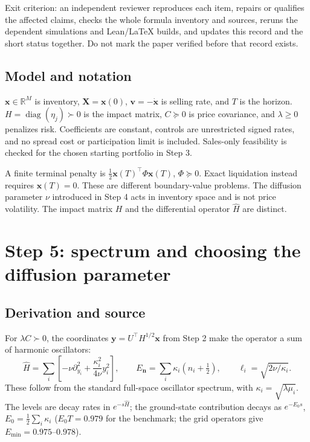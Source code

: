 \documentclass[11pt,a4paper]{article}
\begin{document}
Exit criterion: an independent reviewer reproduces each item, repairs or
qualifies the affected claims, checks the whole formula inventory and sources,
reruns the dependent simulations and Lean/LaTeX builds, and updates this
record and the short status together. Do not mark the paper verified before
that record exists.

\subsection*{Model and notation}

$\mathbf x\in\mathbb R^M$ is inventory, $\mathbf X=\mathbf x(0)$,
$\mathbf v=-\dot{\mathbf x}$ is selling rate, and $T$ is the horizon.
$H=\operatorname{diag}(\eta_j)\succ0$ is the impact matrix,
$C\succeq0$ is price covariance, and $\lambda\ge0$ penalizes risk.
Coefficients are constant, controls are unrestricted signed rates, and no
spread cost or participation limit is included. Sales-only feasibility is
checked for the chosen starting portfolio in Step 3.

A finite terminal penalty is $\tfrac12\mathbf x(T)^\top\Phi\mathbf x(T)$,
$\Phi\succeq0$. Exact liquidation instead requires $\mathbf x(T)=0$.
These are different boundary-value problems. The diffusion parameter $\nu$
introduced in Step 4 acts in inventory space and is not price volatility.
The impact matrix $H$ and the differential operator $\hat H$ are distinct.

\setcounter{section}{1}





\section{Step 5: spectrum and choosing the diffusion parameter}
\label{sec:stage5}

\subsection*{Derivation and source}

For $\lambda C\succ0$, the coordinates $\mathbf y=U^\top H^{1/2}\mathbf x$
from Step 2 make the operator a sum of harmonic oscillators:
\begin{equation}
 \hat H=\sum_i\left[-\nu\partial_{y_i}^2+
 \frac{\kappa_i^2}{4\nu}y_i^2\right],\qquad
 E_{\mathbf n}=\sum_i\kappa_i(n_i+\tfrac12),\qquad
 \ell_i=\sqrt{2\nu/\kappa_i}.
 \label{eq:oscillator}
\end{equation}
These follow from the standard full-space oscillator spectrum, with
$\kappa_i=\sqrt{\lambda\mu_i}$. The levels are decay rates in
$e^{-s\hat H}$; the ground-state contribution decays as $e^{-E_0s}$,
$E_0=\tfrac12\sum_i\kappa_i$ ($E_0T=0.979$ for the benchmark; the grid
operators give $E_{\min}=0.975$--$0.978$).
\end{document}
